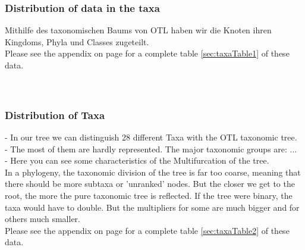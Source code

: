       \subsubsection{Distribution of data in the taxa}
        Mithilfe des taxonomischen Baums von OTL haben wir die Knoten ihren Kingdoms, Phyla und Classes 
          zugeteilt. \\
        Please see the appendix on page \pageref{sec:taxaTable1} for a complete table \ref{sec:taxaTable1} 
          of these data. \\
         \\
         \\

      \subsubsection{Distribution of Taxa}
        - In our tree we can distinguish 28 different Taxa with the OTL taxonomic tree. \\
        - The most of them are hardly represented. The major taxonomic groups are: ... \\
        - Here you can see some characteristics of the Multifurcation of the tree. \\
        In a phylogeny, the taxonomic division of the tree is far too coarse, meaning that there should 
          be more subtaxa or 'unranked' nodes. But the closer we get to the root, the more the pure
          taxonomic tree is reflected. If the tree were binary, the taxa would have to double. But the 
          multipliers for some are much bigger and for others much smaller. \\
        Please see the appendix on page \pageref{sec:taxaTable2} for a complete table \ref{sec:taxaTable2} 
          of these data. \\

